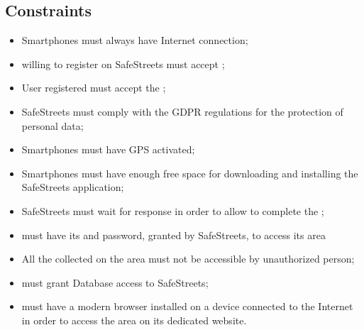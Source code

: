 \documentclass[../../rasd.tex]{subfiles}
\begin{document}
 \subsection{Constraints}
 	\begin{itemize}
 		\item Smartphones must always have Internet connection;
 		\item {} willing to register on SafeStreets must accept ;
 		\item User registered must accept the ;
 		\item SafeStreets must comply with the GDPR regulations for the protection of  personal data;
 		\item Smartphones must have GPS activated;
 		\item Smartphones must have enough free space for downloading and installing the SafeStreets application;
 		\item SafeStreets must wait for  response in order to allow  to complete the ;
 		\item {} must have its  and password, granted by SafeStreets, to access its  area
 		\item All the collected  on the  area must not be accessible by unauthorized person;
 		\item {} must grant  Database access to SafeStreets;
 		\item {} must have a modern browser installed on a device connected to the Internet in order to access the  area on its dedicated website. 

 	\end{itemize}
\end{document}
